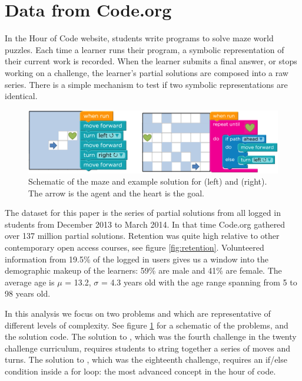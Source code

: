\section{Data from Code.org}





In the Hour of Code website, students write programs to solve maze world puzzles. Each time a learner runs their program, a symbolic representation of their current work is recorded. When the learner submits a final answer, or stops working on a challenge, the learner’s partial solutions are composed into a raw series. There is a simple mechanism to test if two symbolic representations are identical.

\begin{figure}[t]
	\centering
	\includegraphics[width=0.8\columnwidth]{img/problems3.png}

	\caption[Schematic of Code.org problems]{Schematic of the maze and example solution for \Pa (left) and \Pb (right). The arrow is the agent and the heart is the goal.}
	\label{fig:hocExample}
\end{figure}

The dataset for this paper is the series of partial solutions from all logged in students from December 2013 to March 2014. In that time Code.org gathered over 137 million partial solutions. Retention was quite high relative to other contemporary open access courses, see figure \ref{fig:retention}. Volunteered information from 19.5\% of the logged in users gives us a window into the demographic makeup of the learners: 59\% are male and 41\% are female. The average age is $\mu$ = 13.2, $\sigma$ = 4.3 years old with the age range spanning from 5 to 98 years old.


In this analysis we focus on two problems \Pa and \Pb which are representative of different levels of complexity. See figure \ref{fig:hocExample} for a schematic of the problems, and the solution code. The solution to \Pa, which was the fourth challenge in the twenty challenge curriculum, requires students to string together a series of moves and turns. The solution to \Pb, which was the eighteenth challenge, requires an if/else condition inside a for loop: the most advanced concept in the hour of code. 

